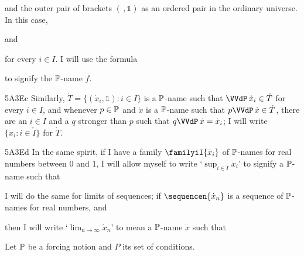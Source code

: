 \noindent and the outer pair of brackets $(\,,\Bbbone)$
as an ordered pair in the ordinary universe.   In this case,


\noindent and


\noindent for every $i\in I$. I will use the formula


\noindent to signify the $\Bbb P$-name $\dot f$.

\spheader 5A3Ec Similarly,
$\dot T=\{(\dot x_i,\Bbbone):i\in I\}$ is a $\Bbb P$-name such that
$\VVdP\,\dot x_i\in\dot T$
for every $i\in I$, and whenever $p\in\Bbb P$ and $\dot x$ is a
$\Bbb P$-name such that $p\VVdP\,\dot x\in\dot T$, there are an $i\in I$
and a $q$ stronger than $p$ such that $q\VVdP\,\dot x=\dot x_i$;  I will
write $\{\dot x_i:i\in\check I\}$ for $\dot T$.

\spheader 5A3Ed
In the same spirit, if I have a family
$\familyiI{\dot x_i}$ of $\Bbb P$-names for real numbers between $0$ and $1$,
I will allow myself to write
`$\sup_{i\in\check I}\dot x_i$' to signify a $\Bbb P$-name such that


\noindent{}I will do the same for limits of sequences;
if $\sequencen{\dot x_n}$ is a sequence of $\Bbb P$-names for real numbers,
and


\noindent then I will write `$\lim_{n\to\infty}\dot x_n$' to mean a
$\Bbb P$-name $\dot x$ such that



 Let
$\Bbb P$ be a forcing notion and $P$ its set of conditions.

